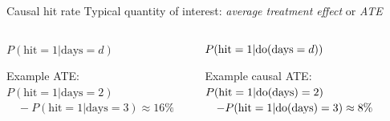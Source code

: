 \begin{frame}{Causal hit rate}
    Typical quantity of interest: \emph{average treatment effect} or \emph{ATE}
    \begin{columns}[T] %
        \begin{column}{.48\textwidth}
            $P(\textrm{hit}=1 | \textrm{days}=d)$\newline

            \newline\newline

            Example ATE: \newline
            $P(\textrm{hit}=1 | \textrm{days} = 2) $\newline
            $\quad - P(\textrm{hit}=1 | \textrm{days} = 3) \approx  16\%$
        \end{column}%
        \begin{column}{.48\textwidth}
            $P(\textrm{hit}=1 | \mathrm{do}(\textrm{days}=d))$\newline

            \newline \newline
            Example causal ATE: \newline
            $P(\textrm{hit}=1 |\mathrm{do}(\textrm{days} )= 2)$\newline
            $\quad - P(\textrm{hit}=1 | \mathrm{do}(\textrm{days}) = 3) \approx 8\%$
        \end{column}%
    \end{columns}

\end{frame}

